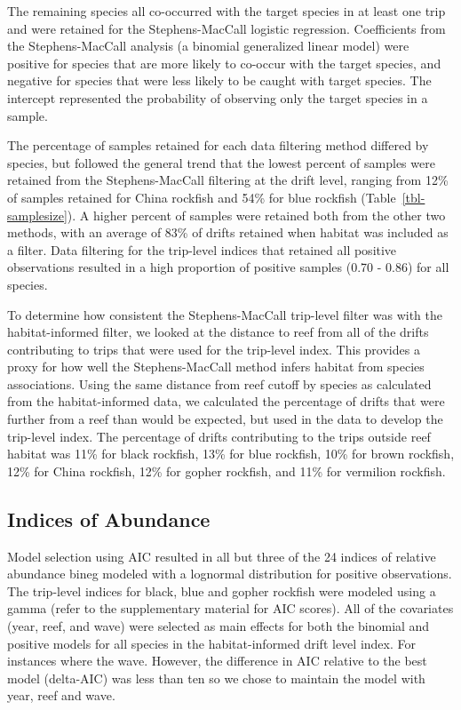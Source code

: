\documentclass[
  12pt,
  authoryear,
  preprint,
  3p]{elsarticle}
\begin{document}
The remaining species all co-occurred with the target species in at
least one trip and were retained for the Stephens-MacCall logistic
regression. Coefficients from the Stephens-MacCall analysis (a binomial
generalized linear model) were positive for species that are more likely
to co-occur with the target species, and negative for species that were
less likely to be caught with target species. The intercept represented
the probability of observing only the target species in a sample.

The percentage of samples retained for each data filtering method
differed by species, but followed the general trend that the lowest
percent of samples were retained from the Stephens-MacCall filtering at
the drift level, ranging from 12\% of samples retained for China
rockfish and 54\% for blue rockfish (Table~\ref{tbl-samplesize}). A
higher percent of samples were retained both from the other two methods,
with an average of 83\% of drifts retained when habitat was included as
a filter. Data filtering for the trip-level indices that retained all
positive observations resulted in a high proportion of positive samples
(0.70 - 0.86) for all species.

To determine how consistent the Stephens-MacCall trip-level filter was
with the habitat-informed filter, we looked at the distance to reef from
all of the drifts contributing to trips that were used for the
trip-level index. This provides a proxy for how well the
Stephens-MacCall method infers habitat from species associations. Using
the same distance from reef cutoff by species as calculated from the
habitat-informed data, we calculated the percentage of drifts that were
further from a reef than would be expected, but used in the data to
develop the trip-level index. The percentage of drifts contributing to
the trips outside reef habitat was 11\% for black rockfish, 13\% for
blue rockfish, 10\% for brown rockfish, 12\% for China rockfish, 12\%
for gopher rockfish, and 11\% for vermilion rockfish.

\hypertarget{indices-of-abundance-1}{%
\subsection{Indices of Abundance}\label{indices-of-abundance-1}}

Model selection using AIC resulted in all but three of the 24 indices of
relative abundance bineg modeled with a lognormal distribution for
positive observations. The trip-level indices for black, blue and gopher
rockfish were modeled using a gamma (refer to the supplementary material
for AIC scores). All of the covariates (year, reef, and wave) were
selected as main effects for both the binomial and positive models for
all species in the habitat-informed drift level index. For instances
where the wave. However, the difference in AIC relative to the best
model (delta-AIC) was less than ten so we chose to maintain the model
with year, reef and wave.
\end{document}

